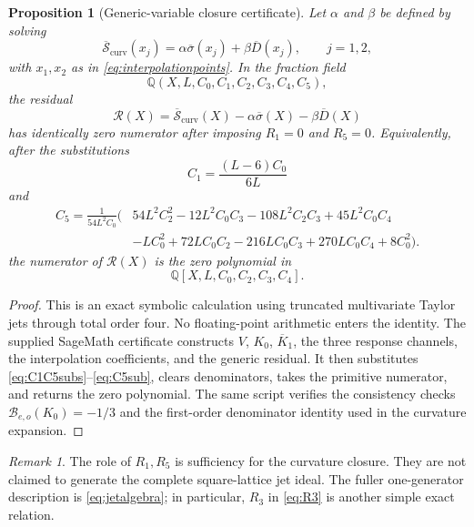 \documentclass[11pt]{article}
\newtheorem{proposition}[theorem]{Proposition}
\theoremstyle{definition}
\theoremstyle{remark}
\newtheorem{remark}[theorem]{Remark}
\newcommand{\Q}{\mathbb{Q}}
\newcommand{\cB}{\mathcal{B}}
\newcommand{\bK}{\overline{K}}
\newcommand{\bsigma}{\overline{\sigma}}
\newcommand{\bD}{\overline{D}}
\newcommand{\bSc}{\overline{\mathcal{S}}_{\mathrm{curv}}}
\begin{document}
\begin{proposition}[Generic-variable closure certificate]\label{prop:certificate}
Let \(\alpha\) and \(\beta\) be defined by solving
\begin{equation}\label{eq:fitab}
 \bSc(x_j)=\alpha\bsigma(x_j)+\beta\bD(x_j),
 \qquad j=1,2,
\end{equation}
with \(x_1,x_2\) as in \eqref{eq:interpolationpoints}. In the fraction field
\[
 \Q(X,L,C_0,C_1,C_2,C_3,C_4,C_5),
\]
the residual
\begin{equation}\label{eq:residual}
 \mathcal R(X)=\bSc(X)-\alpha\bsigma(X)-\beta\bD(X)
\end{equation}
has identically zero numerator after imposing \(R_1=0\) and \(R_5=0\). Equivalently, after the substitutions
\begin{equation}\label{eq:C1C5subs}
 C_1=\frac{(L-6)C_0}{6L}
\end{equation}
and
\begin{equation}\label{eq:C5sub}
\begin{aligned}
 C_5=\frac{1}{54L^2C_0}\bigl(&54L^2C_2^2-12L^2C_0C_3-108L^2C_2C_3
 +45L^2C_0C_4\\
 &-LC_0^2+72LC_0C_2-216LC_0C_3+270LC_0C_4+8C_0^2\bigr).
\end{aligned}
\end{equation}
the numerator of \(\mathcal R(X)\) is the zero polynomial in
\[
 \Q[X,L,C_0,C_2,C_3,C_4].
\]
\end{proposition}

\begin{proof}
This is an exact symbolic calculation using truncated multivariate Taylor jets through total order four. No floating-point arithmetic enters the identity. The supplied SageMath certificate constructs \(V\), \(K_0\), \(\bK_1\), the three response channels, the interpolation coefficients, and the generic residual. It then substitutes \eqref{eq:C1C5subs}--\eqref{eq:C5sub}, clears denominators, takes the primitive numerator, and returns the zero polynomial. The same script verifies the consistency checks \(\cB_{e,o}(K_0)=-1/3\) and the first-order denominator identity used in the curvature expansion.
\end{proof}

\begin{remark}
The role of \(R_1,R_5\) is sufficiency for the curvature closure. They are not claimed to generate the complete square-lattice jet ideal. The fuller one-generator description is \eqref{eq:jetalgebra}; in particular, \(R_3\) in \eqref{eq:R3} is another simple exact relation.
\end{remark}
\end{document}
